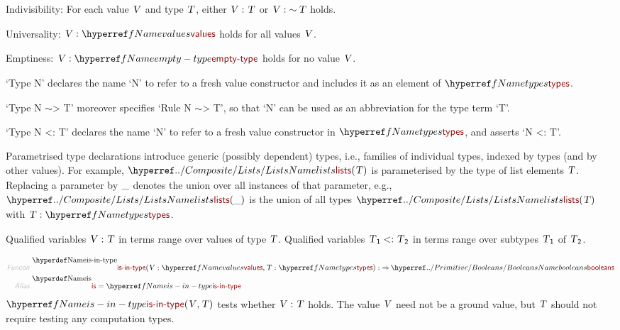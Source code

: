 Indivisibility: For each value $\SHADE{\VAR{V}}$ and type $\SHADE{\VAR{T}}$, either $\SHADE{ \VAR{V} : \VAR{T}}$ or
  $\SHADE{ \VAR{V} : \mathop{\sim} \VAR{T}}$ holds.

Universality: $\SHADE{ \VAR{V} : \NAMEREF{values}}$ holds for all values $\SHADE{\VAR{V}}$.

Emptiness: $\SHADE{ \VAR{V} : \NAMEREF{empty-type}}$ holds for no value $\SHADE{\VAR{V}}$.

{}`Type N{}' declares the name {}`N{}' to refer to a fresh value constructor
  and includes it as an element of $\SHADE{\NAMEREF{types}}$.

{}`Type N \ensuremath{\sim}\textgreater{} T{}' moreover specifies {}`Rule N \ensuremath{\sim}\textgreater{} T{}', so that {}`N{}' can be used as
  an abbreviation for the type term {}`T{}'.

{}`Type N \textless{}: T{}' declares the name {}`N{}' to refer to a fresh value constructor
  in $\SHADE{\NAMEREF{types}}$, and asserts {}`N \textless{}: T{}'.

Parametrised type declarations introduce generic (possibly dependent) types, 
  i.e., families of individual types, indexed by types (and by other values). 
  For example, $\SHADE{\NAMEHYPER{../Composite}{Lists}{lists}
           ( \VAR{T} )}$ is parameterised by the type of list elements $\SHADE{\VAR{T}}$.
  Replacing a parameter by $\strut\_\strut$ denotes the union over all instances of that
  parameter, e.g., $\SHADE{\NAMEHYPER{../Composite}{Lists}{lists}
           ( \_ )}$ is the union of all types $\SHADE{\NAMEHYPER{../Composite}{Lists}{lists}
           ( \VAR{T} )}$ with $\SHADE{\VAR{T} : \NAMEREF{types}}$.

Qualified variables $\SHADE{\VAR{V} : \VAR{T}}$ in terms range over values of type $\SHADE{\VAR{T}}$.
  Qualified variables $\SHADE{\VAR{T}\SUB{1} <: \VAR{T}\SUB{2}}$ in terms range over subtypes $\SHADE{\VAR{T}\SUB{1}}$ of $\SHADE{\VAR{T}\SUB{2}}$.

\begin{align*}
  \KEY{Funcon} ~ 
  & \NAMEDECL{is-in-type}(\VAR{V} : \NAMEREF{values}, \VAR{T} : \NAMEREF{types}) :  \TO \NAMEHYPER{../Primitive}{Booleans}{booleans}
\\
  \KEY{Alias} ~ 
  & \NAMEDECL{is} = \NAMEREF{is-in-type}
\end{align*}
$\SHADE{\NAMEREF{is-in-type}
           ( \VAR{V},   
             \VAR{T} )}$ tests whether $\SHADE{ \VAR{V} : \VAR{T}}$ holds. The value $\SHADE{\VAR{V}}$ need not be a
  ground value, but $\SHADE{\VAR{T}}$ should not require testing any computation types.

